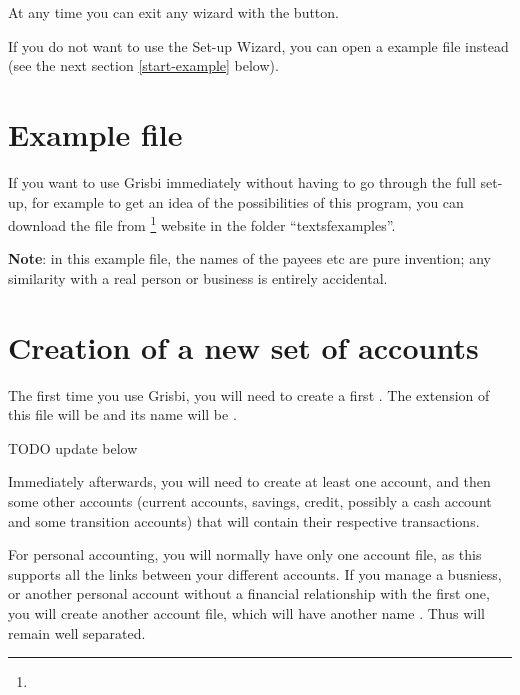 At any time you can exit any wizard with the  button.

If you do not want to use the Set-up Wizard, you can open a example file instead (see the next section \ref{start-example} below).



\section{Example file\label{start-example}}


If you want to use Grisbi immediately without having to go through the full set-up, for example to get an idea of the possibilities of this program, you can download the   file from \footnote{\urlSourceForgeDocumentation{}} website in the folder \enquote{textsf{examples}}.

\textbf{Note}: in this example file, the names of the payees etc are pure invention; any similarity with a real person or business is entirely accidental.

\section{Creation of a new set of accounts\label{start-newfile}}


The first time you use Grisbi, you will need to create a first
. The \gls{extension} of this file will be  and its name will be .

TODO update below

Immediately afterwards, you will need to create at least one account, and then some other accounts (current accounts, savings, credit, possibly a cash account and some transition accounts) that will contain their respective transactions.

For personal accounting, you will normally have only one account file, as this supports all the links between your different accounts. If you manage a busniess, or another personal account without a financial relationship with the first one, you will create another account file, which will have another name . Thus  will remain well separated.



